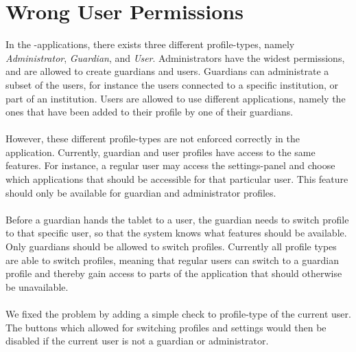 \section{Wrong User Permissions}
\label{sec:wrong_user_permissions}

In the \giraf-applications, there exists three different profile-types, namely \emph{Administrator}, \emph{Guardian}, and \emph{User}. Administrators have the widest permissions, and are allowed to create guardians and users. Guardians can administrate a subset of the users, for instance the users connected to a specific institution, or part of an institution. Users are allowed to use different applications, namely the ones that have been added to their profile by one of their guardians. 
\\\\
However, these different profile-types are not enforced correctly in the \launcher application. Currently, guardian and user profiles have access to the same features. For instance, a regular user may access the settings-panel and choose which applications that should be accessible for that particular user. This feature should only be available for guardian and administrator profiles.
\\\\
Before a guardian hands the tablet to a user, the guardian needs to switch profile to that specific user, so that the system knows what features should be available. Only guardians should be allowed to switch profiles. Currently all profile types are able to switch profiles, meaning that regular users can switch to a guardian profile and thereby gain access to parts of the application that should otherwise be unavailable.
\\\\
We fixed the problem by adding a simple check to profile-type of the current user. The buttons which allowed for switching profiles and settings would then be disabled if the current user is not a guardian or administrator.